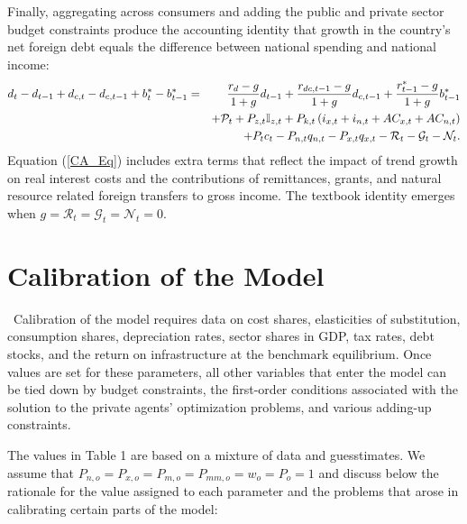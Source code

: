 \documentclass[11pt]{article}
\begin{document}
Finally, aggregating across consumers and adding the public and private
sector budget constraints produce the accounting identity that growth in the
country's net foreign debt equals the difference between national spending
and national income: 
\begin{eqnarray}
d_{t}-d_{t-1}+d_{c,t}-d_{c,t-1}+b_{t}^{\ast }-b_{t-1}^{\ast } &=&\frac{%
r_{d}-g}{1+g}d_{t-1}+\frac{r_{dc,t-1}-g}{1+g}d_{c,t-1}+\frac{r_{t-1}^{\ast
}-g}{1+g}b_{t-1}^{\ast }  \label{CA_Eq} \\
&&+\mathcal{P}_{t}+P_{z,t}\mathbb{I}_{z,t}+P_{k,t}\left(
i_{x,t}+i_{n,t}+AC_{x,t}+AC_{n,t}\right)  \notag \\
&&+P_{t}c_{t}-P_{n,t}q_{n,t}-P_{x,t}q_{x,t}-\mathcal{R}_{t}-\mathcal{G}_{t}-%
\mathcal{N}_{t}.  \notag
\end{eqnarray}%
Equation (\ref{CA_Eq}) includes extra terms that reflect the impact of trend
growth on real interest costs and the contributions of remittances, grants,
and natural resource related foreign transfers to gross income. The textbook
identity emerges when $g=\mathcal{R}_{t}=\mathcal{G}_{t}=\mathcal{N}_{t}=0$.

\section{Calibration of the Model}

\quad\ \thinspace Calibration of the model requires data on cost shares,
elasticities of substitution, consumption shares, depreciation rates, sector
shares in GDP, tax rates, debt stocks, and the return on infrastructure at
the benchmark equilibrium. Once values are set for these parameters, all
other variables that enter the model can be tied down by budget constraints,
the first-order conditions associated with the solution to the private
agents' optimization problems, and various adding-up constraints.

The values in Table 1 are based on a mixture of data and guesstimates. We
assume that $P_{n,o}=P_{x,o}=P_{m,o}=P_{mm,o}=w_{o}=P_{o}=1$ and discuss
below the rationale for the value assigned to each parameter and the
problems that arose in calibrating certain parts of the model:
\end{document}
